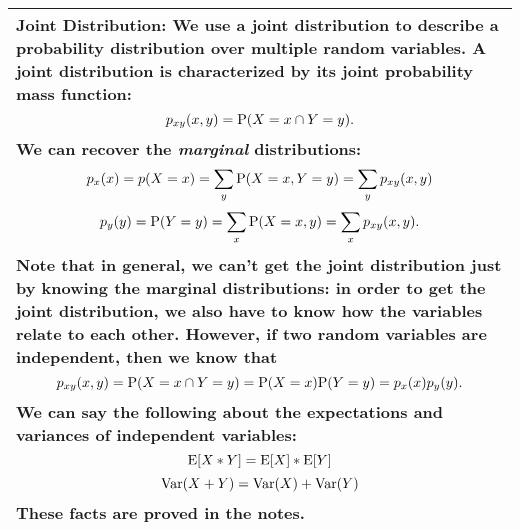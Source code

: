 {\tabulinesep=1mm
\begin{tabu}{|p{16cm} |}
\hline
\textbf{Joint Distribution}: We use a joint distribution to describe a probability distribution over multiple random variables. A joint distribution is characterized by its joint probability mass function: 
\[p_{xy}(x,y) =\P(X=x \cap Y=y).\]
We can recover the \textit{marginal} distributions:
\[p_x(x) = p(X=x) = \sum_y \P(X=x, Y=y) = \sum_y p_{xy}(x, y)\] 
\[p_y(y) = \P(Y=y) = \sum_x \P(X=x, y) = \sum_x p_{xy}(x,y).\]
Note that in general, we can't get the joint distribution just by knowing the marginal distributions: in order to get the joint distribution, we also have to know how the variables relate to each other. However, if two random variables are \textbf{independent}, then we know that 
\[p_{xy}(x,y) = \P(X=x \cap Y=y) = \P(X=x)\P(Y=y) = p_x(x)p_y(y).\]
We can say the following about the expectations and variances of independent variables:
 \[\E[X*Y] = \E[X]*\E[Y]\]
 \[\var(X+Y) = \var(X) + \var(Y)\]
These facts are proved in the notes.

\\
\hline
\end{tabu}

}
